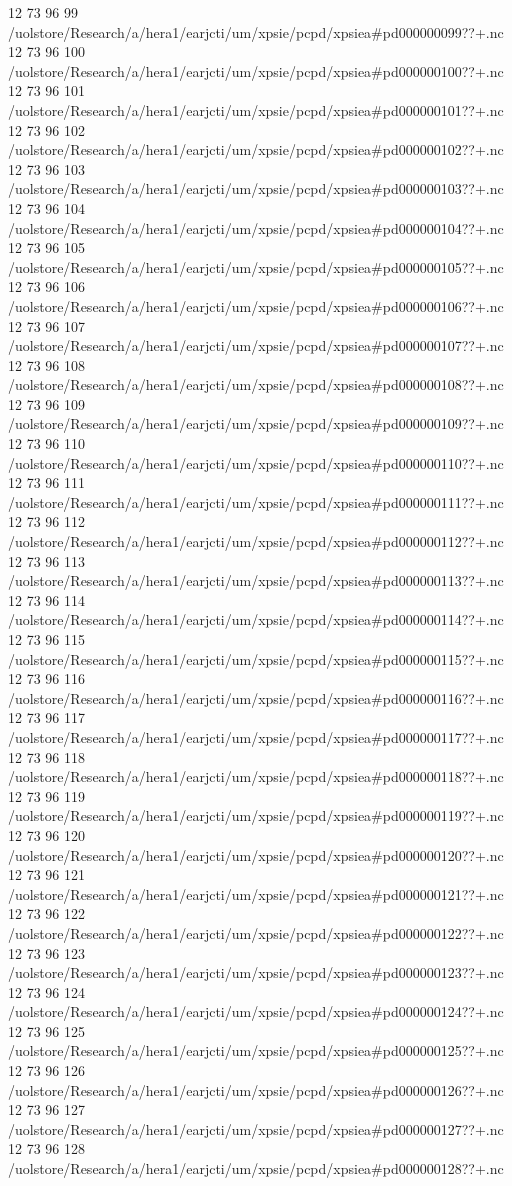 12 73 96
99
/uolstore/Research/a/hera1/earjcti/um/xpsie/pcpd/xpsiea#pd000000099??+.nc
12 73 96
100
/uolstore/Research/a/hera1/earjcti/um/xpsie/pcpd/xpsiea#pd000000100??+.nc
12 73 96
101
/uolstore/Research/a/hera1/earjcti/um/xpsie/pcpd/xpsiea#pd000000101??+.nc
12 73 96
102
/uolstore/Research/a/hera1/earjcti/um/xpsie/pcpd/xpsiea#pd000000102??+.nc
12 73 96
103
/uolstore/Research/a/hera1/earjcti/um/xpsie/pcpd/xpsiea#pd000000103??+.nc
12 73 96
104
/uolstore/Research/a/hera1/earjcti/um/xpsie/pcpd/xpsiea#pd000000104??+.nc
12 73 96
105
/uolstore/Research/a/hera1/earjcti/um/xpsie/pcpd/xpsiea#pd000000105??+.nc
12 73 96
106
/uolstore/Research/a/hera1/earjcti/um/xpsie/pcpd/xpsiea#pd000000106??+.nc
12 73 96
107
/uolstore/Research/a/hera1/earjcti/um/xpsie/pcpd/xpsiea#pd000000107??+.nc
12 73 96
108
/uolstore/Research/a/hera1/earjcti/um/xpsie/pcpd/xpsiea#pd000000108??+.nc
12 73 96
109
/uolstore/Research/a/hera1/earjcti/um/xpsie/pcpd/xpsiea#pd000000109??+.nc
12 73 96
110
/uolstore/Research/a/hera1/earjcti/um/xpsie/pcpd/xpsiea#pd000000110??+.nc
12 73 96
111
/uolstore/Research/a/hera1/earjcti/um/xpsie/pcpd/xpsiea#pd000000111??+.nc
12 73 96
112
/uolstore/Research/a/hera1/earjcti/um/xpsie/pcpd/xpsiea#pd000000112??+.nc
12 73 96
113
/uolstore/Research/a/hera1/earjcti/um/xpsie/pcpd/xpsiea#pd000000113??+.nc
12 73 96
114
/uolstore/Research/a/hera1/earjcti/um/xpsie/pcpd/xpsiea#pd000000114??+.nc
12 73 96
115
/uolstore/Research/a/hera1/earjcti/um/xpsie/pcpd/xpsiea#pd000000115??+.nc
12 73 96
116
/uolstore/Research/a/hera1/earjcti/um/xpsie/pcpd/xpsiea#pd000000116??+.nc
12 73 96
117
/uolstore/Research/a/hera1/earjcti/um/xpsie/pcpd/xpsiea#pd000000117??+.nc
12 73 96
118
/uolstore/Research/a/hera1/earjcti/um/xpsie/pcpd/xpsiea#pd000000118??+.nc
12 73 96
119
/uolstore/Research/a/hera1/earjcti/um/xpsie/pcpd/xpsiea#pd000000119??+.nc
12 73 96
120
/uolstore/Research/a/hera1/earjcti/um/xpsie/pcpd/xpsiea#pd000000120??+.nc
12 73 96
121
/uolstore/Research/a/hera1/earjcti/um/xpsie/pcpd/xpsiea#pd000000121??+.nc
12 73 96
122
/uolstore/Research/a/hera1/earjcti/um/xpsie/pcpd/xpsiea#pd000000122??+.nc
12 73 96
123
/uolstore/Research/a/hera1/earjcti/um/xpsie/pcpd/xpsiea#pd000000123??+.nc
12 73 96
124
/uolstore/Research/a/hera1/earjcti/um/xpsie/pcpd/xpsiea#pd000000124??+.nc
12 73 96
125
/uolstore/Research/a/hera1/earjcti/um/xpsie/pcpd/xpsiea#pd000000125??+.nc
12 73 96
126
/uolstore/Research/a/hera1/earjcti/um/xpsie/pcpd/xpsiea#pd000000126??+.nc
12 73 96
127
/uolstore/Research/a/hera1/earjcti/um/xpsie/pcpd/xpsiea#pd000000127??+.nc
12 73 96
128
/uolstore/Research/a/hera1/earjcti/um/xpsie/pcpd/xpsiea#pd000000128??+.nc
